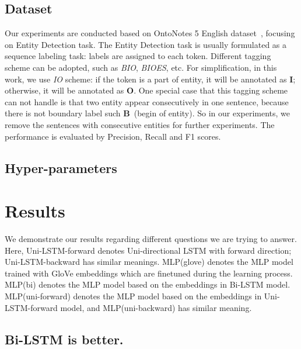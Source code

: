 \documentclass{article}
\begin{document}

\subsection{Dataset} 

Our experiments are conducted based on OntoNotes 5 English dataset~\cite{weischedel2012ontonotes}, focusing on Entity Detection task. The Entity Detection task is usually formulated as a sequence labeling task: labels are assigned to each token. Different tagging scheme can be adopted, such as \textit{BIO}, \textit{BIOES}, etc. For simplification, in this work, we use \textit{IO} scheme: if the token is a part of entity, it will be annotated as \textbf{I}; otherwise, it will be annotated as \textbf{O}. One special case that this tagging scheme can not handle is that two entity appear consecutively in one sentence, because there is not boundary label such \textbf{B}~(begin of entity). So in our experiments, we remove the sentences with consecutive entities for further experiments. The performance is evaluated by Precision, Recall and F1 scores.

\subsection{Hyper-parameters}


\section{Results}

We demonstrate our results regarding different questions we are trying to answer. Here, Uni-LSTM-forward denotes Uni-directional LSTM with forward direction; Uni-LSTM-backward has similar meanings. MLP(glove) denotes the MLP model trained with GloVe embeddings which are finetuned during the learning process. MLP(bi) denotes the MLP model based on the embeddings in Bi-LSTM model. MLP(uni-forward) denotes the MLP model based on the embeddings in Uni-LSTM-forward model, and MLP(uni-backward) has similar meaning.

\subsection{Bi-LSTM is better.}
\end{document}
